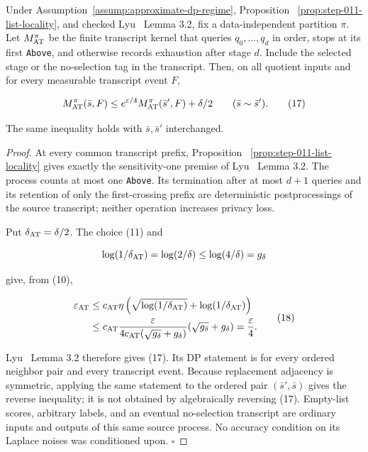 \begin{proposition}\label{prop:step-011-at-privacy}
Under Assumption~\ref{assump:approximate-dp-regime}, Proposition
~\ref{prop:step-011-list-locality}, and checked Lyu~\citep{lyu2025} Lemma 3.2, fix a
data-independent partition \(\pi\). Let \(M_{\rm AT}^{\pi}\) be the finite
transcript kernel that queries \(q_0,\ldots,q_d\) in order, stops at its
first \texttt{Above}, and otherwise records exhaustion after stage \(d\). Include
the selected stage or the no-selection tag in the transcript. Then, on all
quotient inputs and for every measurable transcript event \(F\),

\[
 M_{\rm AT}^{\pi}(\bar s,F)
 \leq e^{\varepsilon/4}
       M_{\rm AT}^{\pi}(\bar s',F)+\delta/2
 \qquad(\bar s\sim\bar s').
\tag{17}
\]

The same inequality holds with \(\bar s,\bar s'\) interchanged.


\end{proposition}

\begin{proof}
At every common transcript prefix, Proposition
~\ref{prop:step-011-list-locality} gives exactly the sensitivity-one
premise of Lyu~\citep{lyu2025} Lemma 3.2. The process counts at most one \texttt{Above}. Its
termination after at most \(d+1\) queries and its retention of only the
first-crossing prefix are deterministic postprocessings of the source
transcript; neither operation increases privacy loss.

Put \(\delta_{\rm AT}=\delta/2\). The choice (11) and

\[
 \log(1/\delta_{\rm AT})=\log(2/\delta)
 \leq \log(4/\delta)=g_\delta
\]

give, from (10),

\[
\begin{aligned}
 \varepsilon_{\rm AT}
 &\leq c_{\rm AT}\eta
   \left(\sqrt{\log(1/\delta_{\rm AT})}
         +\log(1/\delta_{\rm AT})\right)\\
 &\leq c_{\rm AT}
   \frac{\varepsilon}
        {4c_{\rm AT}(\sqrt{g_\delta}+g_\delta)}
   (\sqrt{g_\delta}+g_\delta)
 =\frac{\varepsilon}{4}.
\end{aligned}
\tag{18}
\]

Lyu~\citep{lyu2025} Lemma 3.2 therefore gives (17). Its DP statement is for every ordered
neighbor pair and every transcript event. Because replacement adjacency is
symmetric, applying the same statement to the ordered pair
\((\bar s',\bar s)\) gives the reverse inequality; it is not obtained by
algebraically reversing (17). Empty-list scores, arbitrary labels, and an
eventual no-selection transcript are ordinary inputs and outputs of this
same source process. No accuracy condition on its Laplace noises was
conditioned upon. \(\square\)


\end{proof}

